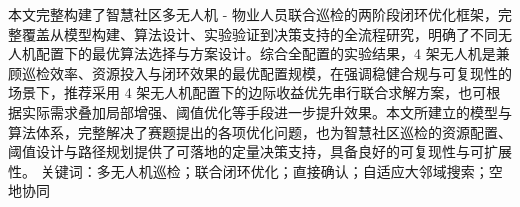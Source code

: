 本文完整构建了智慧社区多无人机 - 物业人员联合巡检的两阶段闭环优化框架，完整覆盖从模型构建、算法设计、实验验证到决策支持的全流程研究，明确了不同无人机配置下的最优算法选择与方案设计。综合全配置的实验结果，4 架无人机是兼顾巡检效率、资源投入与闭环效果的最优配置规模，在强调稳健合规与可复现性的场景下，推荐采用 4 架无人机配置下的边际收益优先串行联合求解方案，也可根据实际需求叠加局部增强、阈值优化等手段进一步提升效果。本文所建立的模型与算法体系，完整解决了赛题提出的各项优化问题，也为智慧社区巡检的资源配置、阈值设计与路径规划提供了可落地的定量决策支持，具备良好的可复现性与可扩展性。
关键词：多无人机巡检；联合闭环优化；直接确认；自适应大邻域搜索；空地协同